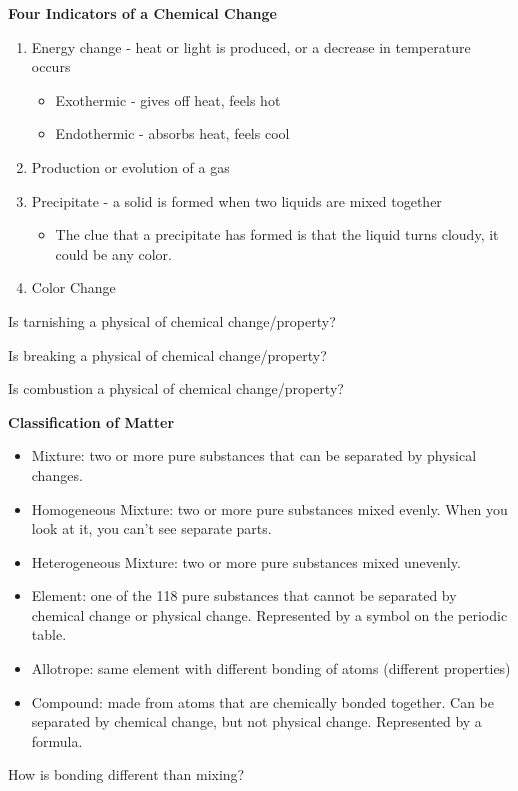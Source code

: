 \documentclass[../hchem.tex]{subfiles}
\begin{document}
\textbf{Four Indicators of a Chemical Change}
\begin{enumerate}
    \item Energy change - heat or light is produced, or a decrease in temperature occurs 
    \begin{itemize}
        \item Exothermic - gives off heat, feels hot 
        \item Endothermic - absorbs heat, feels cool 
    \end{itemize}
    \item Production or evolution of a gas 
    \item Precipitate - a solid is formed when two liquids are mixed together
    \begin{itemize}
        \item The clue that a precipitate has formed is that the liquid turns cloudy, it could be any color.
    \end{itemize}
    \item Color Change 
\end{enumerate}

\ex Is tarnishing a physical of chemical change/property?

\ex Is breaking a physical of chemical change/property?

\ex Is combustion a physical of chemical change/property?

\textbf{Classification of Matter}
\begin{itemize}
    \item Mixture: two or more pure substances that can be separated by physical changes.
    \item Homogeneous Mixture: two or more pure substances mixed evenly. When you look at it, you can't see separate parts.
    \item Heterogeneous Mixture: two or more pure substances mixed unevenly.
    \item Element: one of the 118 pure substances that cannot be separated by chemical change or physical change. Represented by a symbol on the periodic table.
    \item Allotrope: same element with different bonding of atoms (different properties)
    \item Compound: made from atoms that are chemically bonded together. Can be separated by chemical change, but not physical change. Represented by a formula.
\end{itemize}

\ex How is bonding different than mixing?
\end{document}
